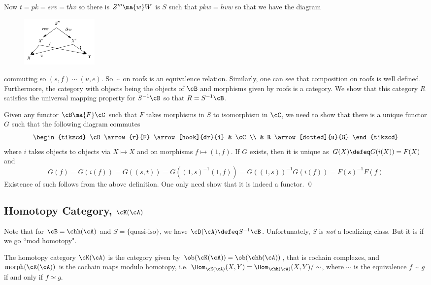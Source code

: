 Now $t=pk=srv=thv$ so there is $Z''' \ma{w} W$ is $S$ such that $pkw=hvw$ so that we have the diagram

\begin{figure}[H] 
   \centering
   \includegraphics[width=1.5in]{images/p8.png} 
\end{figure}

commuting so $(s,f) \sim (u,e)$. So $\sim$ on roofs is an equivalence relation. Similarly, one can see that composition on roofs is well defined. Furthermore, the category with objects being the objects of $\cB$ and morphisms given by roofs is a category. We show that this category $R$ satisfies the universal mapping property for $S^{-1}\cB$ so that $R=S^{-1}\cB$. 

Given any functor $\cB \ma{F} \cC$ such that $F$ takes morphisms in $S$ to isomorphism in $\cC$, we need to show that there is a unique functor $G$ such that the following diagram commutes
\[
\begin{tikzcd}
\cB \arrow{r}{F} \arrow[hook]{dr}{i} & \cC \\
& R \arrow[dotted]{u}{G}
\end{tikzcd}
\]
where $i$ takes objects to objects via $X \mapsto X$ and on morphisms $f \mapsto (1,f)$. If $G$ exists, then it is unique as $G(X) \defeq G(i(X))=F(X)$ and 
\[
G(f)=G(i(f))=G((s,t))=G((1,s)^{-1}(1,f))=G((1,s))^{-1}G(i(f))=F(s)^{-1}F(f)
\]
Existence of such follows from the above definition. One only need show that it is indeed a functor. \qed \\

\subsection{Homotopy Category, $\cK(\cA)$}

Note that for $\cB=\chh(\cA)$ and $S=\{\text{quasi-iso}\}$, we have $\cD(\cA)\defeq S^{-1}\cB$. Unfortunately, $S$ is \emph{not} a localizing class. But it is if we go ``mod homotopy". 

\begin{dfn}
The homotopy category $\cK(\cA)$ is the category given by $\ob(\cK(\cA))=\ob(\chh(\cA))$, that is cochain complexes, and $\text{morph}(\cK(\cA))$ is the cochain maps modulo homotopy, i.e. $\Hom_{\cK(\cA)}(X,Y)=\Hom_{\chh(\cA)}(X,Y)/\sim$, where $\sim$ is the equivalence $f \sim g$ if and only if $f \simeq g$. 
\end{dfn}

